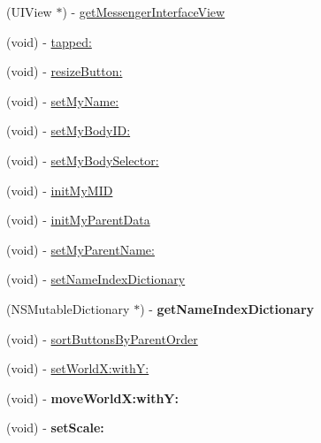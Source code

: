 \begin{DoxyCompactItemize}
\item 
(UIView $\ast$) -\/ \hyperlink{interface_messenger_view_controller_ae7d3fbe4156df4e7f1539f50500f0919}{getMessengerInterfaceView}
\item 
(void) -\/ \hyperlink{interface_messenger_view_controller_a008c7cc6364c75b6f70ef3d79fa3a043}{tapped:}
\item 
(void) -\/ \hyperlink{interface_messenger_view_controller_a61c88e671203c5651b89394f3b300285}{resizeButton:}
\item 
(void) -\/ \hyperlink{interface_messenger_view_controller_afe36a73932b47fb2c60412c6f03f67ac}{setMyName:}
\item 
(void) -\/ \hyperlink{interface_messenger_view_controller_abab9347cc7ed46bd04978ca00e081a0e}{setMyBodyID:}
\item 
(void) -\/ \hyperlink{interface_messenger_view_controller_ade8005d21b7d8df69ddd12fba7440f6b}{setMyBodySelector:}
\item 
(void) -\/ \hyperlink{interface_messenger_view_controller_a2c2f7a46b94facbc66d66c7dd6da34bd}{initMyMID}
\item 
(void) -\/ \hyperlink{interface_messenger_view_controller_a5728b61e9c4490af7aacddd874026bae}{initMyParentData}
\item 
(void) -\/ \hyperlink{interface_messenger_view_controller_a9d6939385be720d5335fbf5b095cd63c}{setMyParentName:}
\item 
(void) -\/ \hyperlink{interface_messenger_view_controller_a791916fe5a33b084e90d14cd12d9bc30}{setNameIndexDictionary}
\item 
\hypertarget{interface_messenger_view_controller_a27a84207c430e3402014720823e7b7dd}{
(NSMutableDictionary $\ast$) -\/ {\bfseries getNameIndexDictionary}}
\label{interface_messenger_view_controller_a27a84207c430e3402014720823e7b7dd}

\item 
(void) -\/ \hyperlink{interface_messenger_view_controller_a6c8d083521df8a95e9e88612745d5981}{sortButtonsByParentOrder}
\item 
(void) -\/ \hyperlink{interface_messenger_view_controller_a3939f43ce30df6b8df0390712730282b}{setWorldX:withY:}
\item 
\hypertarget{interface_messenger_view_controller_a48556e3f4bded903ba3080d2411ce5ec}{
(void) -\/ {\bfseries moveWorldX:withY:}}
\label{interface_messenger_view_controller_a48556e3f4bded903ba3080d2411ce5ec}

\item 
\hypertarget{interface_messenger_view_controller_a4f8fb574a6997e9f92731c32a4155c77}{
(void) -\/ {\bfseries setScale:}}
\label{interface_messenger_view_controller_a4f8fb574a6997e9f92731c32a4155c77}


\end{DoxyCompactItemize}
